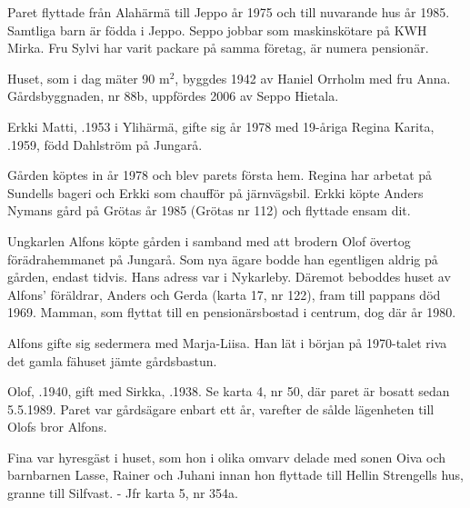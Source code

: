Paret flyttade från Alahärmä till Jeppo år 1975 och till nuvarande hus år 1985. Samtliga barn är födda i Jeppo. Seppo jobbar som maskinskötare på KWH Mirka. Fru Sylvi har varit packare på samma företag, är numera pensionär.

Huset, som i dag mäter 90 m$^2$, byggdes 1942 av Haniel Orrholm med fru Anna. Gårdsbyggnaden, nr 88b, uppfördes 2006 av Seppo Hietala.


%
Erkki Matti, .1953 i Ylihärmä, gifte sig år 1978 med 19-åriga Regina Karita, .1959, född Dahlström på Jungarå.
\begin{jhchildren}
  \item {}
  \item {}
\end{jhchildren}
Gården köptes in år 1978 och blev parets första hem. Regina har arbetat på Sundells bageri och Erkki som chaufför på järnvägsbil. Erkki köpte Anders Nymans gård på Grötas år 1985 (Grötas nr 112) och flyttade ensam dit.


%
Ungkarlen Alfons köpte gården i samband med att brodern Olof övertog förädrahemmanet på Jungarå. Som nya ägare bodde han egentligen aldrig på gården, endast tidvis. Hans adress var i Nykarleby. Däremot beboddes huset av Alfons' föräldrar, Anders och Gerda (karta 17, nr 122), fram till pappans död 1969. Mamman, som flyttat till en pensionärsbostad i centrum, dog där år 1980.

Alfons gifte sig sedermera med Marja-Liisa. Han lät i början på 1970-talet riva det gamla fähuset jämte gårdsbastun.


%
Olof, .1940, gift med Sirkka, .1938. Se karta 4, nr 50, där paret är bosatt sedan 5.5.1989. Paret var gårdsägare enbart ett år, varefter de sålde lägenheten till Olofs bror Alfons.


%
Fina var hyresgäst i huset, som hon i olika omvarv delade med sonen Oiva och barnbarnen Lasse, Rainer och Juhani innan hon flyttade till Hellin Strengells hus, granne till Silfvast. - Jfr karta 5, nr 354a.



